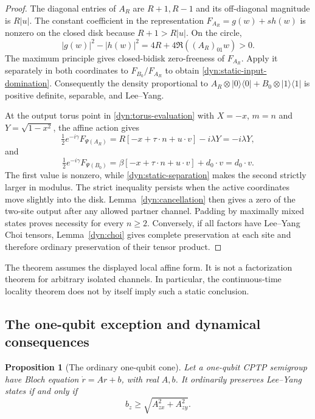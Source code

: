 \documentclass[reqno]{amsart}
\newtheorem{proposition}[theorem]{Proposition}
\theoremstyle{definition}
\theoremstyle{remark}
\begin{document}
\begin{proof}
The diagonal entries of $A_R$ are $R+1,R-1$ and its off-diagonal
magnitude is $R|u|$.  The constant coefficient in the representation
$F_{A_R}=g(w)+s h(w)$ is nonzero on the closed disk because
$R+1>R|u|$.  On the circle,
\[
 |g(w)|^2-|h(w)|^2
 =4R+4\Re((A_R)_{01}w)>0.
\]
The maximum principle gives closed-bidisk zero-freeness of $F_{A_R}$.
Apply it separately in both coordinates to $F_{B_0}/F_{A_R}$ to obtain
\eqref{dyn:static-input-domination}.
Consequently the density proportional to
$A_R\otimes|0\rangle\langle0|+B_0\otimes|1\rangle\langle1|$
is positive definite, separable, and Lee--Yang.

At the output torus point in \eqref{dyn:torus-evaluation} with
$X=-x$, $m=n$ and $Y=\sqrt{1-x^2}$, the affine action gives
\[
 \tfrac12e^{-i\gamma}F_{\Psi(A_R)}
 =R[-x+\tau\cdot n+u\cdot v]-i\lambda Y=-i\lambda Y,
\]
and
\[
 \tfrac12e^{-i\gamma}F_{\Psi(B_0)}
 =\beta[-x+\tau\cdot n+u\cdot v]+d_0\cdot v=d_0\cdot v.
\]
The first value is nonzero, while \eqref{dyn:static-separation} makes
the second strictly larger in modulus.  The strict inequality persists
when the active coordinates move slightly into the disk.
Lemma~\ref{dyn:cancellation} then gives a zero of the two-site output
after any allowed partner channel.  Padding by maximally mixed states
proves necessity for every $n\ge2$.
Conversely, if all factors have Lee--Yang Choi tensors,
Lemma~\ref{dyn:choi} gives complete preservation at each site and therefore
ordinary preservation of their tensor product.
\end{proof}

The theorem assumes the displayed local affine form.  It is not a
factorization theorem for arbitrary isolated channels.  In particular,
the continuous-time locality theorem does not by itself imply such a
static conclusion.

\subsection{The one-qubit exception and dynamical consequences}

\begin{proposition}[The ordinary one-qubit cone]\label{dyn:one-qubit}
Let a one-qubit CPTP semigroup have Bloch equation
$\dot r=Ar+b$, with real $A,b$.  It ordinarily preserves Lee--Yang states
if and only if
\begin{equation}\label{dyn:hemisphere-generator}
 b_z\ge\sqrt{A_{zx}^2+A_{zy}^2}.
\end{equation}
\end{proposition}
\end{document}
